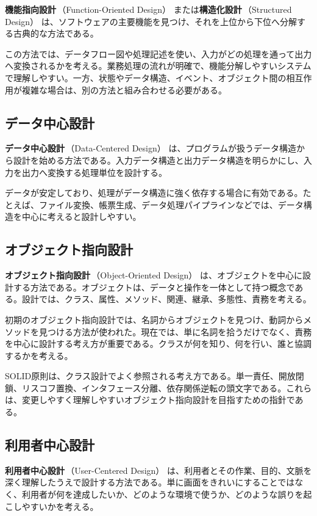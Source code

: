 \documentclass[10.5pt,a4paper]{ltjsarticle}
\newcommand{\term}[2]{\textbf{#1}\,（#2）}
\begin{document}
\term{機能指向設計}{Function-Oriented Design} または\term{構造化設計}{Structured Design} は、ソフトウェアの主要機能を見つけ、それを上位から下位へ分解する古典的な方法である。

この方法では、データフロー図や処理記述を使い、入力がどの処理を通って出力へ変換されるかを考える。業務処理の流れが明確で、機能分解しやすいシステムで理解しやすい。一方、状態やデータ構造、イベント、オブジェクト間の相互作用が複雑な場合は、別の方法と組み合わせる必要がある。

\subsection{データ中心設計}

\term{データ中心設計}{Data-Centered Design} は、プログラムが扱うデータ構造から設計を始める方法である。入力データ構造と出力データ構造を明らかにし、入力を出力へ変換する処理単位を設計する。

データが安定しており、処理がデータ構造に強く依存する場合に有効である。たとえば、ファイル変換、帳票生成、データ処理パイプラインなどでは、データ構造を中心に考えると設計しやすい。

\subsection{オブジェクト指向設計}

\term{オブジェクト指向設計}{Object-Oriented Design} は、オブジェクトを中心に設計する方法である。オブジェクトは、データと操作を一体として持つ概念である。設計では、クラス、属性、メソッド、関連、継承、多態性、責務を考える。

初期のオブジェクト指向設計では、名詞からオブジェクトを見つけ、動詞からメソッドを見つける方法が使われた。現在では、単に名詞を拾うだけでなく、責務を中心に設計する考え方が重要である。クラスが何を知り、何を行い、誰と協調するかを考える。

SOLID原則は、クラス設計でよく参照される考え方である。単一責任、開放閉鎖、リスコフ置換、インタフェース分離、依存関係逆転の頭文字である。これらは、変更しやすく理解しやすいオブジェクト指向設計を目指すための指針である。

\subsection{利用者中心設計}

\term{利用者中心設計}{User-Centered Design} は、利用者とその作業、目的、文脈を深く理解したうえで設計する方法である。単に画面をきれいにすることではなく、利用者が何を達成したいか、どのような環境で使うか、どのような誤りを起こしやすいかを考える。
\end{document}
